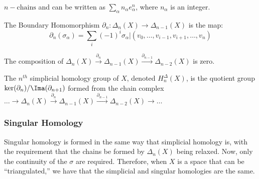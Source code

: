 \documentclass[crop=false,class=article,oneside]{standalone}
\begin{document}
            $n-\textrm{chains}$ and can be written as
            $\sum_{\alpha}n_{\alpha}e_{\alpha}^{n}$, where
            $n_{\alpha}$ is an integer.
            \begin{definition}
                The Boundary Homomorphism
                $\partial_{n}:%
                 \Delta_{n}(X)\rightarrow\Delta_{n-1}(X)$
                is the map:
                \begin{equation*}
                    \partial_{n}(\sigma_{\alpha})=
                    \sum_{i}(-1)^{i}\sigma_{\alpha}|
                    (v_{0},\hdots,v_{i-1},v_{i+1},\hdots,v_{n})
                \end{equation*}
            \end{definition}
            \begin{theorem}
                The composition of
                $\Delta_{n}(X)%
                 \overset{\partial_{n}}{\longrightarrow}%
                 \Delta_{n-1}(X)%
                 \overset{\partial_{n-1}}{\longrightarrow}%
                 \Delta_{n-2}(X)$
                is zero.
            \end{theorem}
            \begin{definition}
                The $n^{th}$ simplicial homology group of
                $X$, denoted $H_{n}^{\Delta}(X)$,
                is the quotient group
                $\ker(\partial_{n})/\Ima(\partial_{n+1})$
                formed from the chain complex
                $\hdots\longrightarrow\Delta_{n}(X)%
                 \overset{\partial_{n}}{\longrightarrow}%
                 \Delta_{n-1}(X)%
                 \overset{\partial_{n-1}}{\longrightarrow}%
                 \Delta_{n-2}(X)\longrightarrow\hdots$
            \end{definition}
        \subsubsection{Singular Homology}
            Singular homology is formed in the same way that
            simplicial homology is, with the requirement
            that the chains be formed by $\Delta_{n}(X)$ being
            relaxed. Now, only the continuity of the $\sigma$
            are required. Therefore, when $X$ is a space that can
            be ``triangulated,'' we have that the simplicial
            and singular homologies are the same.
\end{document}
